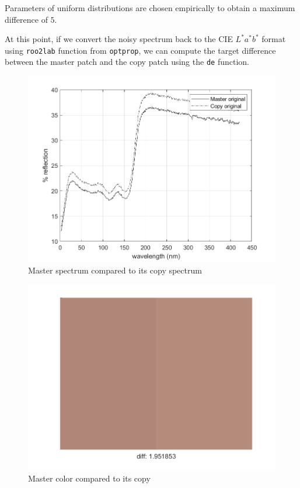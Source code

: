 \documentclass[twocolumn,a4paper]{article}
\begin{document}
Parameters of uniform distributions are chosen empirically to obtain a maximum difference of $5$.

At this point, if we convert the noisy spectrum back to the CIE $L^*a^*b^*$ format using \texttt{roo2lab} function from \texttt{optprop}, we can compute the target difference between the master patch and the copy patch using the \texttt{de} function.

\begin{figure}
    \centering
    \includegraphics[scale=0.5]{images/C_5_120_masterCopy.png}
    \caption{Master spectrum compared to its copy spectrum}
    \label{fig:master_copy}
\end{figure}
\clearpage
\begin{figure}
    \centering
    \includegraphics[scale=0.3]{images/E_120_masterCopyView.png}
    \caption{Master color compared to its copy}
    \label{fig:master_copy_col}
\end{figure}
\end{document}

